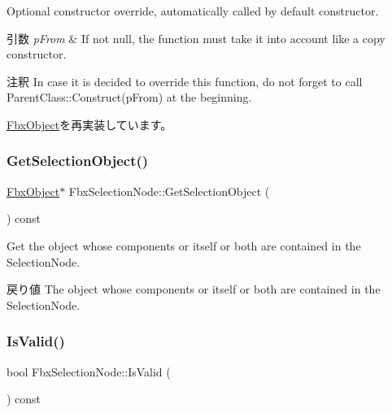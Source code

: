 Optional constructor override, automatically called by default constructor. 
\begin{DoxyParams}{引数}
{\em p\+From} & If not null, the function must take it into account like a copy constructor. \\
\hline
\end{DoxyParams}
\begin{DoxyRemark}{注釈}
In case it is decided to override this function, do not forget to call Parent\+Class\+::\+Construct(p\+From) at the beginning. 
\end{DoxyRemark}


\hyperlink{class_fbx_object_a313503bc645af3fdceb4a99ef5cea7eb}{Fbx\+Object}を再実装しています。

\mbox{\label{class_fbx_selection_node_a1c78c8d31e14c7cb99e059963eee820c}} 
\subsubsection{\texorpdfstring{Get\+Selection\+Object()}{GetSelectionObject()}}
{\footnotesize\ttfamily \hyperlink{class_fbx_object}{Fbx\+Object}$\ast$ Fbx\+Selection\+Node\+::\+Get\+Selection\+Object (\begin{DoxyParamCaption}{ }\end{DoxyParamCaption}) const}

Get the object whose components or itself or both are contained in the Selection\+Node. \begin{DoxyReturn}{戻り値}
The object whose components or itself or both are contained in the Selection\+Node. 
\end{DoxyReturn}
\mbox{\label{class_fbx_selection_node_a600d1609bd33e1453f082a971a9498f9}} 
\subsubsection{\texorpdfstring{Is\+Valid()}{IsValid()}}
{\footnotesize\ttfamily bool Fbx\+Selection\+Node\+::\+Is\+Valid (\begin{DoxyParamCaption}{ }\end{DoxyParamCaption}) const}

